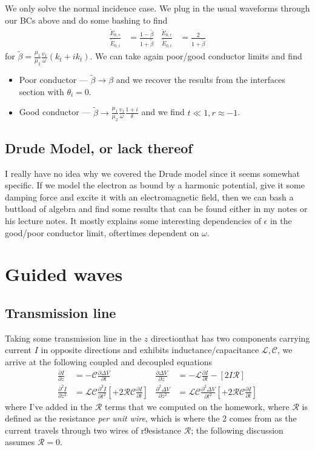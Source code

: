 \documentclass[10pt,twocolumn]{article}
\newcommand{\pd}[2]{\frac{\partial#1}{\partial#2}}
\newcommand{\ptd}[2]{\frac{\partial^2 #1}{\partial#2^2}}
\begin{document}
We only solve the normal incidence case. We plug in the usual waveforms through our BCs above and do some bashing to find
\begin{align}
    \frac{\tilde{E}_{0,r}}{\tilde{E}_{0,i}} &= \frac{1 - \tilde{\beta}}{1 + \tilde{\beta}} & \frac{\tilde{E}_{0,r}}{\tilde{E}_{0,i}} &= \frac{2}{1 + \tilde{\beta}}
\end{align}
for $\tilde{\beta} = \frac{\mu_1}{\mu_2}\frac{v_1}{\omega}(k_t + ik_t)$. We can take again poor/good conductor limits and find
\begin{itemize}
    \item Poor conductor --- $\tilde{\beta} \to \beta$ and we recover the results from the interfaces section with $\theta_i = 0$.
    \item Good conductor --- $\tilde{\beta} \to \frac{\mu_1}{\mu_2}\frac{v_1}{\omega}\frac{1+i}{\delta}$ and we find $t \ll 1, r \approx -1$.
\end{itemize}

\subsection{Drude Model, or lack thereof}

I really have no idea why we covered the Drude model since it seems somewhat specific. If we model the electron as bound by a harmonic potential, give it some damping force and excite it with an electromagnetic field, then we can bash a buttload of algebra and find some results that can be found either in my notes or his lecture notes. It mostly explains some interesting dependencies of $\epsilon$ in the good/poor conductor limit, oftertimes dependent on $\omega$. 

\section{Guided waves}

\subsection{Transmission line}

Taking some transmission line in the $z$ directionthat has two components carrying current $I$ in opposite directions and exhibits inductance/capacitance $\mathcal{L}, \mathcal{C}$, we arrive at the following coupled and decoupled equations
{\small
\begin{align}
    \pd{I}{z} &= -\mathcal{C}\pd{\Delta V}{t} & \pd{\Delta V}{z} &= -\mathcal{L}\pd{I}{t} - [2I\mathcal{R}]\\
    \ptd{I}{z} &= \mathcal{LC}\ptd{I}{t} \left[ + 2\mathcal{RC}\pd{I}{t} \right]& \ptd{\Delta V}{z} &= \mathcal{LC}\ptd{\Delta V}{t} \left[ + 2\mathcal{RC}\pd{I}{t} \right]
\end{align}}
where I've added in the $\mathcal{R}$ terms that we computed on the homework, where $\mathcal{R}$ is defined as the resistance \emph{per unit wire}, which is where the $2$ comes from as the current travels through two wires of r9esistance $\mathcal{R}$; the following discussion assumes $\mathcal{R} = 0$. 
\end{document}
